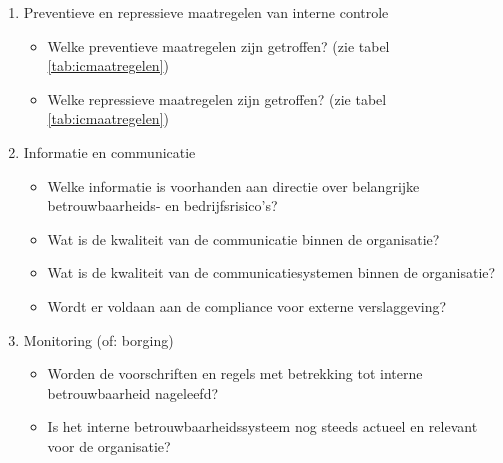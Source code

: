 \documentclass[10pt,a4paper,twoside]{report}
\begin{document}
\begin{enumerate}
\begin{itemize}
        \end{itemize}
    \item Preventieve en repressieve maatregelen van interne controle
        \begin{itemize}
            \item Welke preventieve maatregelen zijn getroffen? (zie tabel \ref{tab:icmaatregelen})
            \item Welke repressieve maatregelen zijn getroffen? (zie tabel \ref{tab:icmaatregelen})
        \end{itemize}
    \item Informatie en communicatie
        \begin{itemize}
            \item Welke informatie is voorhanden aan directie over belangrijke betrouwbaarheids- en bedrijfsrisico's?
            \item Wat is de kwaliteit van de communicatie binnen de organisatie?
            \item Wat is de kwaliteit van de communicatiesystemen binnen de organisatie?
            \item Wordt er voldaan aan de compliance voor externe verslaggeving? 
        \end{itemize}
    \item Monitoring (of: borging)
        \begin{itemize}
            \item Worden de voorschriften en regels met betrekking tot interne betrouwbaarheid nageleefd?
            \item Is het interne betrouwbaarheidssysteem nog steeds actueel en relevant voor de organisatie?
        \end{itemize}
\end{enumerate}
\end{document}
